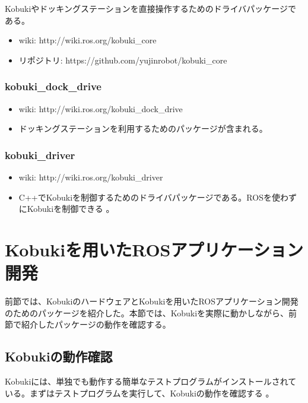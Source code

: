 \begin{itemize}
Kobukiやドッキングステーションを直接操作するためのドライバパッケージである。

\begin{itemize}
\item wiki: http://wiki.ros.org/kobuki\_core
\item リポジトリ: https://github.com/yujinrobot/kobuki\_core
\end{itemize}

\subsubsection{kobuki\_dock\_drive}

\begin{itemize}
\item wiki: http://wiki.ros.org/kobuki\_dock\_drive
\item ドッキングステーションを利用するためのパッケージが含まれる。
\end{itemize}

\subsubsection{kobuki\_driver}

\begin{itemize}
\item wiki: http://wiki.ros.org/kobuki\_driver
\item C++でKobukiを制御するためのドライバパッケージである。ROSを使わずにKobukiを制御できる  。
\end{itemize}

\section{Kobukiを用いたROSアプリケーション開発}

前節では、KobukiのハードウェアとKobukiを用いたROSアプリケーション開発  のためのパッケージを紹介した。本節では、Kobukiを実際に動かしながら、前節で紹介したパッケージの動作を確認する。

\subsection{Kobukiの動作確認}

Kobukiには、単独でも動作する簡単なテストプログラムがインストールされている。まずはテストプログラムを実行して、Kobukiの動作を確認する  。


\end{itemize}
